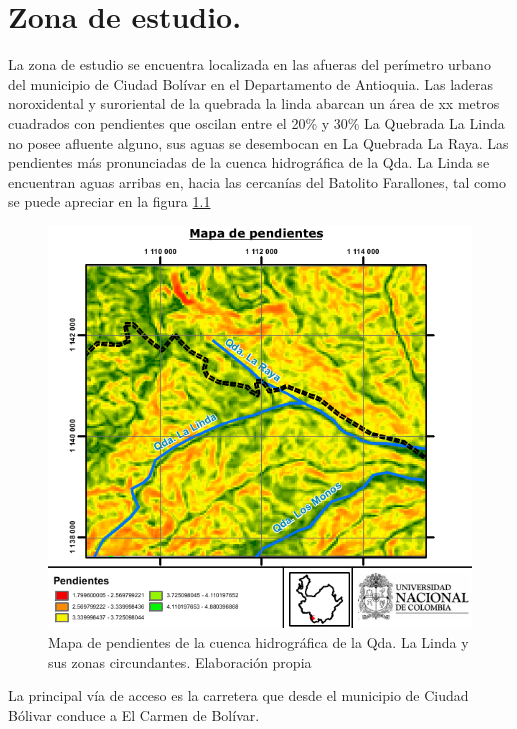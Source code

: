 \chapter{Zona de estudio.}
La zona de estudio se encuentra localizada en las afueras del per\'imetro urbano del municipio de Ciudad Bol\'ivar en el Departamento de Antioquia. 
Las laderas noroxidental y suroriental de la quebrada la linda abarcan un \'area de xx metros cuadrados con pendientes que oscilan entre el 20\% y 30\%
 La Quebrada La Linda no posee afluente alguno, sus aguas se desembocan en La Quebrada La Raya.
Las pendientes m\'as pronunciadas de la cuenca hidrogr\'afica de la Qda. La Linda se encuentran aguas arribas en, hacia las cercan\'ias del Batolito Farallones, tal como se puede apreciar en la figura \ref{fig:slopes}

\begin{figure}[H]
\centering
\includegraphics[scale=1]{img/pendientes.pdf}
\caption{Mapa de pendientes de la cuenca hidrogr\'afica de la Qda. La Linda y sus zonas circundantes. Elaboraci\'on propia}
\label{fig:slopes}
\end{figure}
La principal v\'ia de acceso es la carretera que desde el municipio de Ciudad B\'olivar conduce a El Carmen de Bol\'ivar.
